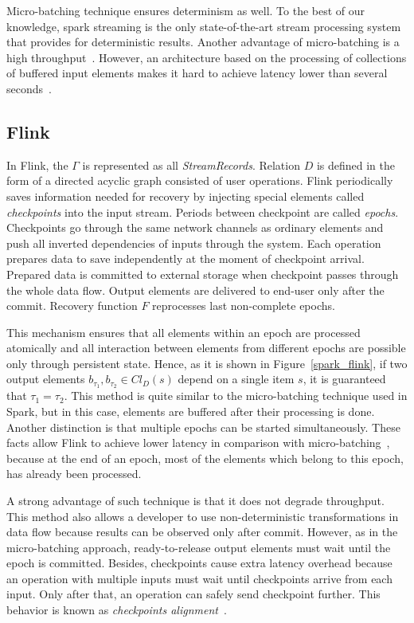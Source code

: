Micro-batching technique ensures determinism as well. To the best of our knowledge, spark streaming is the only state-of-the-art stream processing system that provides for deterministic results. Another advantage of micro-batching is a high throughput~\cite{karimov2018benchmarking}. However, an architecture based on the processing of collections of buffered input elements makes it hard to achieve latency lower than several seconds~\cite{7530084, 7474816}. 

\subsection{Flink}

In Flink, the  $\Gamma$ is represented as all {\em StreamRecords}. Relation $D$ is defined in the form of a directed acyclic graph consisted of user operations. Flink periodically saves information needed for recovery by injecting special elements called {\em checkpoints} into the input stream. Periods between checkpoint are called {\em epochs}. Checkpoints go through the same network channels as ordinary elements and push all inverted dependencies of inputs through the system. Each operation prepares data to save independently at the moment of checkpoint arrival. Prepared data is committed to external storage when checkpoint passes through the whole data flow. Output elements are delivered to end-user only after the commit. Recovery function $F$ reprocesses last non-complete epochs.

This mechanism ensures that all elements within an epoch are processed atomically and all interaction between elements from different epochs are possible only through persistent state. Hence, as it is shown in Figure~\ref{spark_flink}, if two output elements $b_{\tau_1},b_{\tau_2} \in Cl_D(s)$ depend on a single item $s$, it is guaranteed that $\tau_1=\tau_2$. This method is quite similar to the micro-batching technique used in Spark, but in this case, elements are buffered after their processing is done. Another distinction is that multiple epochs can be started simultaneously. These facts allow Flink to achieve lower latency in comparison with micro-batching~\cite{karimov2018benchmarking}, because at the end of an epoch, most of the elements which belong to this epoch, has already been processed.

A strong advantage of such technique is that it does not degrade throughput. This method also allows a developer to use non-deterministic transformations in data flow because results can be observed only after commit. However, as in the micro-batching approach, ready-to-release output elements must wait until the epoch is committed.  Besides, checkpoints cause extra latency overhead because an operation with multiple inputs must wait until checkpoints arrive from each input. Only after that, an operation can safely send checkpoint further. This behavior is known as {\em checkpoints alignment}~\cite{Carbone:2017:SMA:3137765.3137777}.
